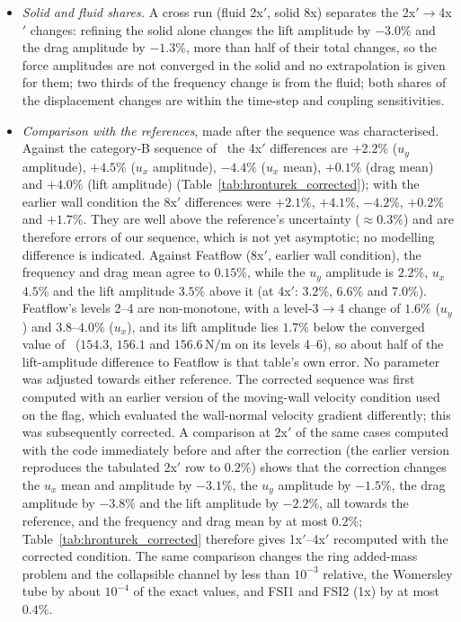 \begin{itemize}
	\item \emph{Solid and fluid shares.} A cross run (fluid 2x$'$, solid 8x) separates the 2x$'\to$4x$'$ changes: refining the solid alone changes the lift amplitude by $-3.0\%$ and the drag amplitude by $-1.3\%$, more than half of their total changes, so the force amplitudes are not converged in the solid and no extrapolation is given for them; two thirds of the frequency change is from the fluid; both shares of the displacement changes are within the time-step and coupling sensitivities.
	\item \emph{Comparison with the references}, made after the sequence was characterised. Against the category-B sequence of~\citet{Failer2020} the 4x$'$ differences are $+2.2\%$ ($u_y$ amplitude), $+4.5\%$ ($u_x$ amplitude), $-4.4\%$ ($u_x$ mean), $+0.1\%$ (drag mean) and $+4.0\%$ (lift amplitude) (Table~\ref{tab:hronturek_corrected}); with the earlier wall condition the 8x$'$ differences were $+2.1\%$, $+4.1\%$, $-4.2\%$, $+0.2\%$ and $+1.7\%$. They are well above the reference's uncertainty ($\approx0.3\%$) and are therefore errors of our sequence, which is not yet asymptotic; no modelling difference is indicated. Against Featflow (8x$'$, earlier wall condition), the frequency and drag mean agree to $0.15\%$, while the $u_y$ amplitude is $2.2\%$, $u_x$ $4.5\%$ and the lift amplitude $3.5\%$ above it (at 4x$'$: $3.2\%$, $6.6\%$ and $7.0\%$). Featflow's levels 2--4 are non-monotone, with a level-3$\to$4 change of $1.6\%$ ($u_y$) and $3.8$--$4.0\%$ ($u_x$), and its lift amplitude lies $1.7\%$ below the converged value of~\citet{Failer2020} ($154.3$, $156.1$ and $156.6\,\mathrm{N/m}$ on its levels 4--6), so about half of the lift-amplitude difference to Featflow is that table's own error. No parameter was adjusted towards either reference. The corrected sequence was first computed with an earlier version of the moving-wall velocity condition used on the flag, which evaluated the wall-normal velocity gradient differently; this was subsequently corrected. A comparison at 2x$'$ of the same cases computed with the code immediately before and after the correction (the earlier version reproduces the tabulated 2x$'$ row to $0.2\%$) shows that the correction changes the $u_x$ mean and amplitude by $-3.1\%$, the $u_y$ amplitude by $-1.5\%$, the drag amplitude by $-3.8\%$ and the lift amplitude by $-2.2\%$, all towards the reference, and the frequency and drag mean by at most $0.2\%$; Table~\ref{tab:hronturek_corrected} therefore gives 1x$'$--4x$'$ recomputed with the corrected condition. The same comparison changes the ring added-mass problem and the collapsible channel by less than $10^{-3}$ relative, the Womersley tube by about $10^{-4}$ of the exact values, and FSI1 and FSI2 (1x) by at most $0.4\%$.

\end{itemize}

